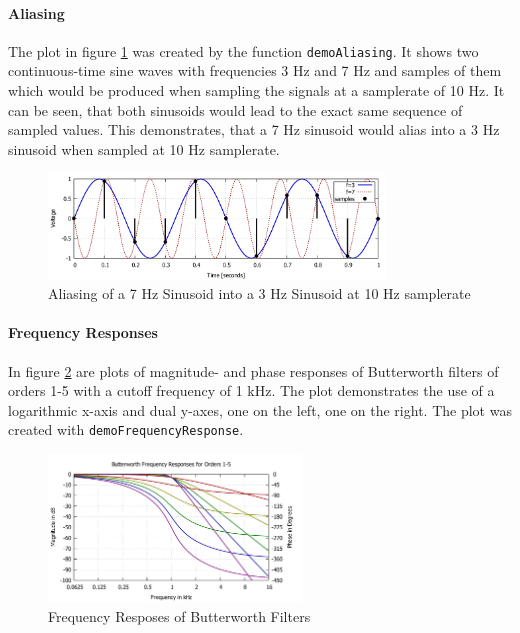 \documentclass[11pt]{article}
\begin{document}
\paragraph{Aliasing}
The plot in figure \ref{fig:Aliasing} was created by the function \texttt{demoAliasing}. It shows two continuous-time sine waves with frequencies 3 Hz and 7 Hz and samples of them which would be produced when sampling the signals at a samplerate of 10 Hz. It can be seen, that both sinusoids would lead to the exact same sequence of sampled values. This demonstrates, that a 7 Hz sinusoid would alias into a 3 Hz sinusoid when sampled at 10 Hz samplerate.
\begin{figure}[h!]
	\centering
  	\includegraphics[width=0.80\textwidth]{Plots/Aliasing.pdf}
	\caption{Aliasing of a 7 Hz Sinusoid into a 3 Hz Sinusoid at 10 Hz samplerate}
	\label{fig:Aliasing}
\end{figure}

\paragraph{Frequency Responses}
In figure \ref{fig:ButterworthResponses} are plots of magnitude- and phase responses of Butterworth filters of orders 1-5 with a cutoff frequency of 1 kHz. The plot demonstrates the use of a logarithmic x-axis and dual y-axes, one on the left, one on the right. The plot was created with \texttt{demoFrequencyResponse}.
\begin{figure}[h!]
	\centering
  	\includegraphics[width=0.60\textwidth]{Plots/ButterworthResponses.pdf}
	\caption{Frequency Resposes of Butterworth Filters}
	\label{fig:ButterworthResponses}
\end{figure}
\end{document}
